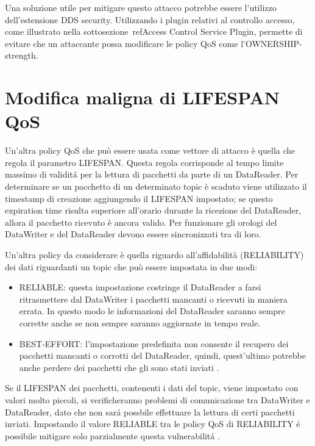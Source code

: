 Una soluzione utile per mitigare questo attacco potrebbe essere l'utilizzo
dell'estensione DDS security. Utilizzando i plugin relativi al controllo accesso,
come illustrato nella sottosezione~ref{Access Control Service Plugin}, permette
di evitare che un attaccante possa modificare le policy QoS come 
l'OWNERSHIP-strength.


\section{Modifica maligna di LIFESPAN QoS}

Un'altra policy QoS che può essere usata come vettore di attacco è quella
che regola il parametro LIFESPAN. Questa regola corrisponde al tempo limite massimo 
di validitá per la
lettura di pacchetti da parte di un DataReader. Per determinare se un pacchetto
di un determinato topic è scaduto viene utilizzato il timestamp di creazione
aggiungendo il LIFESPAN impostato; se questo expiration time risulta
superiore all'orario durante la ricezione del DataReader, allora il pacchetto
ricevuto è ancora valido. 
Per funzionare gli orologi del DataWriter e del DataReader
devono essere sincronizzati tra di loro.

Un'altra policy da considerare è quella riguardo all'affidabilità
(RELIABILITY) dei dati riguardanti un topic che può essere impostata in due
modi:
\begin{itemize}
    \item RELIABLE: questa impostazione costringe il DataReader a farsi
    ritrasmettere dal DataWriter i pacchetti mancanti o ricevuti in maniera errata.
    In questo modo le informazioni del DataReader saranno sempre corrette anche
    se non sempre saranno aggiornate in tempo reale.
    \item BEST-EFFORT: l'impostazione predefinita non consente il recupero
    dei pacchetti mancanti o corrotti
    del DataReader, quindi, quest'ultimo potrebbe anche perdere dei pacchetti 
    che gli sono stati inviati \cite{dds1.4}.
\end{itemize}
Se il LIFESPAN dei pacchetti, contenenti i dati del topic,
viene impostato con valori molto piccoli, si verificheranno problemi di comunicazione
tra DataWriter e DataReader, dato che non sará possbile effettuare la lettura di 
certi pacchetti inviati. Impostando il valore RELIABLE tra le policy QoS di
RELIABILITY é possibile mitigare 
solo parzialmente questa vulnerabilitá
\cite{DBLP:conf/malware/MichaudDL18}.

